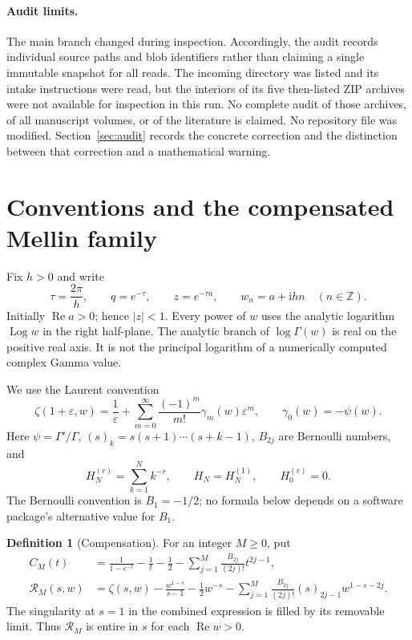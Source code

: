 \documentclass[11pt,a4paper]{article}
\numberwithin{equation}{section}
\theoremstyle{definition}
\newtheorem{definition}[theorem]{Definition}
\theoremstyle{remark}
\DeclareMathOperator{\Log}{Log}
\DeclareMathOperator{\Ree}{Re}
\newcommand{\ii}{\mathrm i}
\newcommand{\Z}{\mathbb Z}
\newcommand{\eps}{\varepsilon}
\newcommand{\Rcal}{\mathcal R}
\begin{document}
\paragraph{Audit limits.}
The main branch changed during inspection. Accordingly, the audit
records individual source paths and blob identifiers rather than
claiming a single immutable snapshot for all reads. The incoming
directory was listed and its intake instructions were read, but the
interiors of its five then-listed ZIP archives were not available for
inspection in this run. No complete audit of those archives, of all
manuscript volumes, or of the literature is claimed. No repository file
was modified. Section~\ref{sec:audit} records the concrete correction
and the distinction between that correction and a mathematical warning.

\section{Conventions and the compensated Mellin family}
\label{sec:conventions}

Fix $h>0$ and write
\begin{equation}\label{eq:scale}
 \tau=\frac{2\pi}{h},\qquad q=e^{-\tau},\qquad z=e^{-\tau a},
 \qquad w_n=a+\ii hn\quad(n\in\Z).
\end{equation}
Initially $\Ree a>0$; hence $|z|<1$. Every power of $w$ uses the analytic
logarithm $\Log w$ in the right half-plane. The analytic branch of
$\log\Gamma(w)$ is real on the positive real axis. It is not the
principal logarithm of a numerically computed complex Gamma value.

We use the Laurent convention
\begin{equation}\label{eq:stieltjes-convention}
 \zeta(1+\eps,w)=\frac1\eps+
 \sum_{m=0}^{\infty}\frac{(-1)^m}{m!}\gamma_m(w)\eps^m,
 \qquad \gamma_0(w)=-\psi(w).
\end{equation}
Here $\psi=\Gamma'/\Gamma$, $(s)_k=s(s+1)\cdots(s+k-1)$,
$B_{2j}$ are Bernoulli numbers, and
\[
 H_N^{(r)}=\sum_{k=1}^N k^{-r},\qquad H_N=H_N^{(1)},\qquad H_0^{(r)}=0.
\]
The Bernoulli convention is $B_1=-1/2$; no formula below depends on a
software package's alternative value for $B_1$.

\begin{definition}[Compensation]\label{def:compensation}
For an integer $M\ge0$, put
\begin{align}
 C_M(t)&=\frac1{1-e^{-t}}-\frac1t-\frac12
       -\sum_{j=1}^M\frac{B_{2j}}{(2j)!}t^{2j-1},\label{eq:kernel}\\
 \Rcal_M(s,w)&=\zeta(s,w)-\frac{w^{1-s}}{s-1}-\frac12w^{-s}
       -\sum_{j=1}^M\frac{B_{2j}}{(2j)!}(s)_{2j-1}w^{1-s-2j}.
 \label{eq:remainder}
\end{align}
The singularity at $s=1$ in the combined expression is filled by its
removable limit. Thus $\Rcal_M$ is entire in $s$ for each $\Ree w>0$.
\end{definition}
\end{document}
